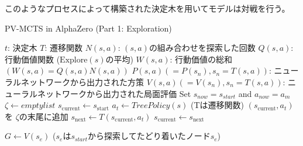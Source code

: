 	
このようなプロセスによって構築された決定木を用いてモデルは対戦を行う。
\newpage
\begin{algorithm}
    \caption{PV-MCTS in AlphaZero (Part 1: Exploration)}
    \label{alg:mcts-1}
    \begin{algorithmic}[1]
        \State $t$: 決定木
        \State $T$: 遷移関数
        \State $N(s, a)$: $(s, a)$の組み合わせを探索した回数
        \State $Q(s, a)$: 行動価値関数 ($\textrm{Explore}(s)$の平均)
        \State $W(s, a)$: 行動価値の総和$(W(s, a)=Q(s, a)N(s, a))$
        \State $P(s, a)(=P(s_n), s_n=T(s, a))$: 
        \State ニューラルネットワークから出力された方策
        \State $V(s, a)(=V(s_n), s_n=T(s, a))$: 
        \State ニューラルネットワークから出力された局面評価
            \State Set $s_{now} = s_{start}$ and $a_{now} = a_m$
                \State $\zeta \gets empty list$
                \State $s_{\text{current}} \gets s_{\text{start}}$
                    \State $a_t \gets TreePolicy(s)$
                    \State (Tは遷移関数)
                    \State $(s_{\text{current}}, a_t)$を $\zeta $の末尾に追加
                    \State $s_{\text{next}} \gets T(s_{\text{current}}, a_t)$
                    \State $s_{\text{current}} \gets s_{\text{next}}$
                    
                \EndWhile
                \State $G \gets V(s_e)$ 
                \State($s_e$は$s_{start}$から探索してたどり着いたノード$s_e$)
                \State {}
            \EndFor
        \EndFunction
        
        
    \end{algorithmic}
\end{algorithm}
